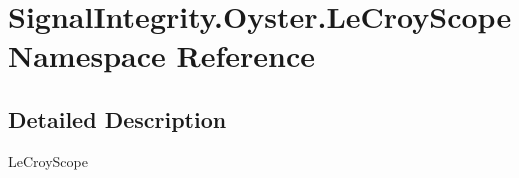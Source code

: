 \hypertarget{namespaceSignalIntegrity_1_1Oyster_1_1LeCroyScope}{}\section{Signal\+Integrity.\+Oyster.\+Le\+Croy\+Scope Namespace Reference}
\label{namespaceSignalIntegrity_1_1Oyster_1_1LeCroyScope}


\subsection{Detailed Description}
\begin{DoxyVerb}LeCroyScope\end{DoxyVerb}
 